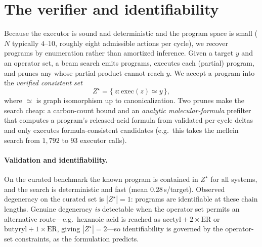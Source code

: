 \documentclass[11pt]{article}
\theoremstyle{definition}
\newcommand{\zstar}{\ensuremath{Z^{\star}}}
\begin{document}
\section{The verifier and identifiability}
\label{sec:verifier}

Because the executor is sound and deterministic and the program space is small ($N$ typically
$4$--$10$, roughly eight admissible actions per cycle), we recover programs by enumeration
rather than amortized inference. Given a target $y$ and an operator set, a beam search emits
programs, executes each (partial) program, and prunes any whose partial product cannot reach
$y$. We accept a program into the \emph{verified consistent set}
\begin{equation}
\zstar = \big\{\, z : \mathrm{exec}(z) \simeq y \,\big\},
\end{equation}
where $\simeq$ is graph isomorphism up to canonicalization. Two prunes make the search cheap: a
carbon-count bound and an \emph{analytic molecular-formula} prefilter that computes a program's
released-acid formula from validated per-cycle deltas and only executes formula-consistent
candidates (e.g.\ this takes the mellein search from $1{,}792$ to $93$ executor calls).

\paragraph{Validation and identifiability.} On the curated benchmark the known program is
contained in \zstar{} for all systems, and the search is deterministic and fast (mean
$0.28$\,s/target). Observed degeneracy on the curated set is $|\zstar|=1$: programs are
identifiable at these chain lengths. Genuine degeneracy \emph{is} detectable when the operator
set permits an alternative route---e.g.\ hexanoic acid is reached as
$\text{acetyl}+2\!\times\!\text{ER}$ or $\text{butyryl}+1\!\times\!\text{ER}$, giving
$|\zstar|=2$---so identifiability is governed by the operator-set constraints, as the
formulation predicts.
\end{document}
